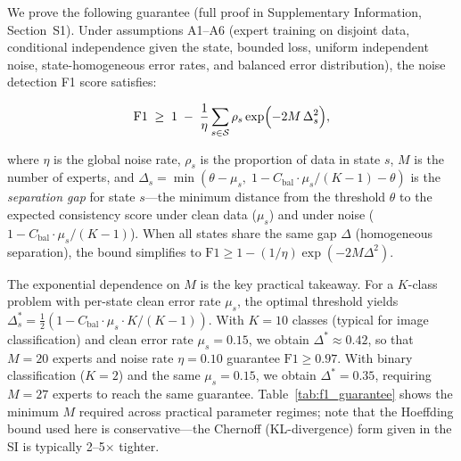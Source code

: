 We prove the following guarantee (full proof in Supplementary Information, Section~S1). Under assumptions A1--A6 (expert training on disjoint data, conditional independence given the state, bounded loss, uniform independent noise, state-homogeneous error rates, and balanced error distribution), the noise detection F1 score satisfies:

\begin{equation}
\mathrm{F1} \;\geq\; 1 \;-\; \frac{1}{\eta} \sum_{s \in \mathcal{S}} \rho_s \exp\Bigl(-2M\,\Delta_s^2\Bigr),
\label{eq:theorem1}
\end{equation}

where $\eta$ is the global noise rate, $\rho_s$ is the proportion of data in state $s$, $M$ is the number of experts, and $\Delta_s = \min(\theta - \mu_s,\; 1 - C_{\text{bal}}\cdot\mu_s/(K-1) - \theta)$ is the \emph{separation gap} for state $s$---the minimum distance from the threshold $\theta$ to the expected consistency score under clean data ($\mu_s$) and under noise ($1 - C_{\text{bal}}\cdot\mu_s/(K-1)$). When all states share the same gap $\Delta$ (homogeneous separation), the bound simplifies to $\mathrm{F1} \geq 1 - (1/\eta)\exp(-2M\Delta^2)$.

The exponential dependence on $M$ is the key practical takeaway. For a $K$-class problem with per-state clean error rate $\mu_s$, the optimal threshold yields $\Delta_s^* = \frac{1}{2}(1 - C_{\text{bal}}\cdot\mu_s\cdot K/(K-1))$. With $K = 10$ classes (typical for image classification) and clean error rate $\mu_s = 0.15$, we obtain $\Delta^* \approx 0.42$, so that $M = 20$ experts and noise rate $\eta = 0.10$ guarantee $\mathrm{F1} \geq 0.97$. With binary classification ($K = 2$) and the same $\mu_s = 0.15$, we obtain $\Delta^* = 0.35$, requiring $M = 27$ experts to reach the same guarantee. Table~\ref{tab:f1_guarantee} shows the minimum $M$ required across practical parameter regimes; note that the Hoeffding bound used here is conservative---the Chernoff (KL-divergence) form given in the SI is typically 2--5$\times$ tighter.

